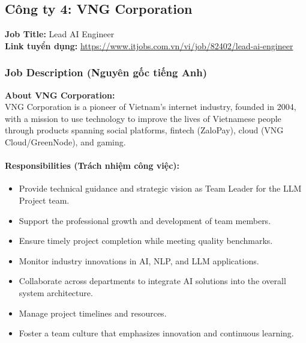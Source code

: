 \subsection{Công ty 4: VNG Corporation}

\noindent\textbf{Job Title:} Lead AI Engineer \\
\textbf{Link tuyển dụng:} \url{https://www.itjobs.com.vn/vi/job/82402/lead-ai-engineer}

\subsubsection*{Job Description (Nguyên gốc tiếng Anh)}

\textbf{About VNG Corporation:} \\
\indent VNG Corporation is a pioneer of Vietnam's internet industry, founded in 2004, with a mission to use technology to improve the lives of Vietnamese people through products spanning social platforms, fintech (ZaloPay), cloud (VNG Cloud/GreenNode), and gaming.

\paragraph{Responsibilities (Trách nhiệm công việc):}
\begin{itemize}
    \item Provide technical guidance and strategic vision as Team Leader for the LLM Project team.
    \item Support the professional growth and development of team members.
    \item Ensure timely project completion while meeting quality benchmarks.
    \item Monitor industry innovations in AI, NLP, and LLM applications.
    \item Collaborate across departments to integrate AI solutions into the overall system architecture.
    \item Manage project timelines and resources.
    \item Foster a team culture that emphasizes innovation and continuous learning.
\end{itemize}

